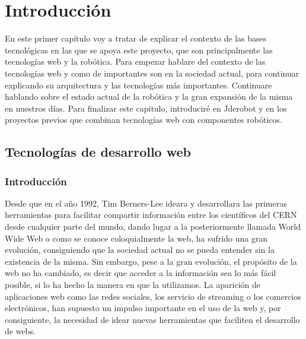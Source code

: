 \chapter{Introducción}\label{cap.introduccion}
En este primer capítulo voy a tratar de explicar el contexto de las bases tecnológicas en las que se apoya este proyecto, que son principalmente las tecnologías web y la robótica. Para empezar hablare del contexto de las tecnologías web y como de importantes son en la sociedad actual, para continuar explicando su arquitectura y las tecnologías más importantes. Continuare hablando sobre el estado actual de la robótica y la gran expansión de la misma en nuestros días. Para finalizar este capitulo, introduciré en Jderobot y en los proyectos previos que combinan tecnologías web con componentes robóticos.
\section{Tecnologías de desarrollo web}
\subsection{Introducción}
Desde que en el año 1992, Tim Berners-Lee ideara y desarrollara las primeras herramientas para facilitar compartir información entre los científicos del CERN desde cualquier parte del mundo, dando lugar a la posteriormente llamada World Wide Web o como se conoce coloquialmente la web, ha sufrido una gran evolución, consiguiendo que la sociedad actual no se pueda entender sin la existencia de la misma. Sin embargo, pese a la gran evolución, el propósito de la web no ha cambiado, es decir que acceder a la información sea lo más fácil posible, si lo ha hecho la manera en que la utilizamos. La aparición de aplicaciones web como las redes sociales, los servicio de streaming o los comercios electrónicos, han supuesto un impulso importante en el uso de la web y, por consiguiente, la necesidad de idear nuevas herramientas que faciliten el desarrollo de webs.

